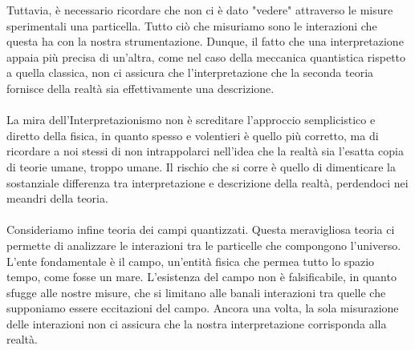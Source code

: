 \documentclass[]{article}
\begin{document}
	Tuttavia, è necessario ricordare che non ci è dato "vedere" attraverso le misure sperimentali una particella. Tutto ciò che misuriamo sono le interazioni che questa ha con la nostra strumentazione. Dunque, il fatto che una interpretazione appaia più precisa di un'altra, come nel caso della meccanica quantistica rispetto a quella classica, non ci assicura che l'interpretazione che la seconda teoria fornisce della realtà sia effettivamente una descrizione.    \\\\ 
	La mira dell'Interpretazionismo non è screditare l'approccio semplicistico e diretto della fisica, in quanto spesso e volentieri è quello più corretto, ma di ricordare a noi stessi di non intrappolarci nell'idea che la realtà sia l'esatta copia di teorie umane, troppo umane.  Il rischio che si corre è quello di dimenticare la sostanziale differenza tra interpretazione e descrizione della realtà, perdendoci nei meandri della teoria.\\
	\\
	Consideriamo infine teoria dei campi quantizzati. Questa meravigliosa teoria ci permette di analizzare le interazioni tra le particelle che compongono l'universo. L'ente fondamentale è il campo, un'entità fisica che permea tutto lo spazio tempo, come fosse un mare. L'esistenza del campo non è falsificabile, in quanto sfugge alle nostre misure, che si limitano alle banali interazioni tra quelle che supponiamo essere eccitazioni del campo. Ancora una volta, la sola misurazione delle interazioni non ci assicura che la nostra interpretazione corrisponda alla realtà. \\
\end{document}

